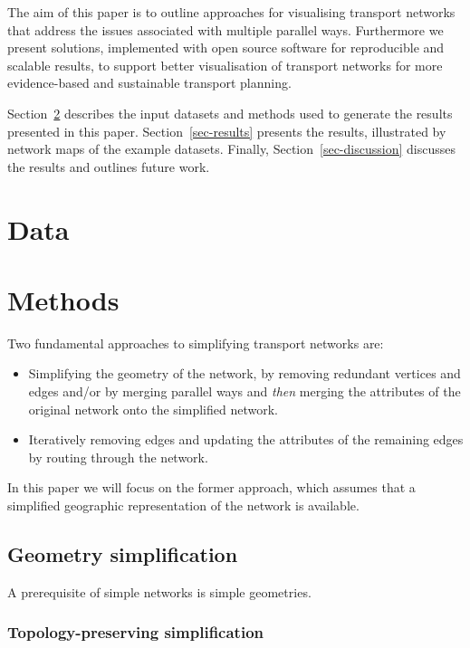 \documentclass[
  letterpaper,
  DIV=11,
  numbers=noendperiod]{scrartcl}
\providecommand{\tightlist}{%
  \setlength{\itemsep}{0pt}\setlength{\parskip}{0pt}}\usepackage{longtable,booktabs,array}
\begin{document}
The aim of this paper is to outline approaches for visualising transport
networks that address the issues associated with multiple parallel ways.
Furthermore we present solutions, implemented with open source software
for reproducible and scalable results, to support better visualisation
of transport networks for more evidence-based and sustainable transport
planning.

Section~\ref{sec-methods} describes the input datasets and methods used
to generate the results presented in this paper.
Section~\ref{sec-results} presents the results, illustrated by network
maps of the example datasets. Finally, Section~\ref{sec-discussion}
discusses the results and outlines future work.

\hypertarget{data}{%
\section{Data}\label{data}}

\hypertarget{sec-methods}{%
\section{Methods}\label{sec-methods}}

Two fundamental approaches to simplifying transport networks are:

\begin{itemize}
\tightlist
\item
  Simplifying the geometry of the network, by removing redundant
  vertices and edges and/or by merging parallel ways and \emph{then}
  merging the attributes of the original network onto the simplified
  network.
\item
  Iteratively removing edges and updating the attributes of the
  remaining edges by routing through the network.
\end{itemize}

In this paper we will focus on the former approach, which assumes that a
simplified geographic representation of the network is available.

\hypertarget{geometry-simplification}{%
\subsection{Geometry simplification}\label{geometry-simplification}}

A prerequisite of simple networks is simple geometries.

\hypertarget{topology-preserving-simplification}{%
\subsubsection{Topology-preserving
simplification}\label{topology-preserving-simplification}}
\end{document}

